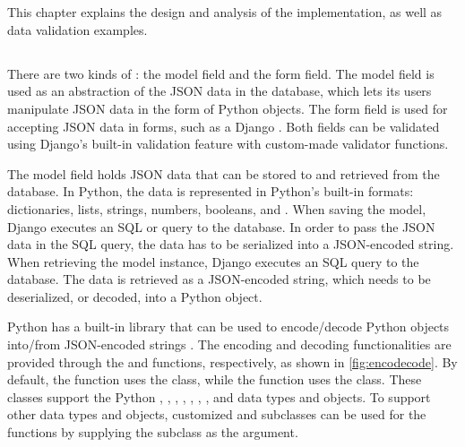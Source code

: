 \chapter{\babTiga}

This chapter explains the design and analysis of the 
implementation, as well as  data validation examples.

\section{}

There are two kinds of : the model field and the form field.
The model field is used as an abstraction of the JSON data in the database,
which lets its users manipulate JSON data in the form of Python objects.
The form field is used for accepting JSON data in forms, such as a Django
. Both fields can be validated using Django's built-in
validation feature with custom-made validator functions.

The model field holds JSON data that can be stored to and retrieved from the
database. In Python, the data is represented in Python's built-in formats:
dictionaries, lists, strings, numbers, booleans, and . When saving
the model, Django executes an SQL  or  query to the
database. In order to pass the JSON data in the SQL query, the data has to be
serialized into a JSON-encoded string. When retrieving the model instance,
Django executes an SQL  query to the database. The data is
retrieved as a JSON-encoded string, which needs to be deserialized, or decoded,
into a Python object.

Python has a built-in  library that can be used to encode/decode
Python objects into/from JSON-encoded strings \cite{python:json}. The encoding
and decoding functionalities are provided through the  and
 functions, respectively, as shown in
\autoref{fig:encodecode}. By default, the  function uses the
 class, while the  function uses the
 class. These classes support the Python ,
, , , , , ,
and  data types and objects. To support other data types and
objects, customized  and 
subclasses can be used for the functions by supplying the subclass as the
 argument.

